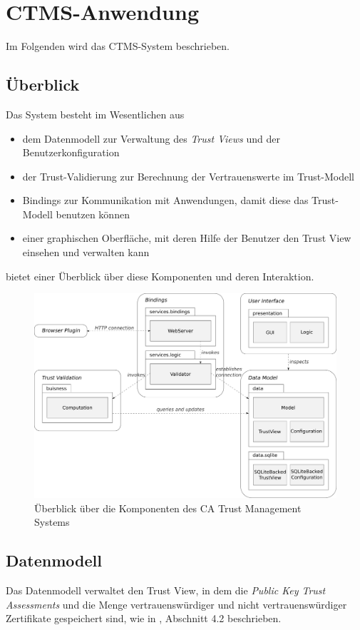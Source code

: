 \documentclass[accentcolor=tud1c,article,colorback,11pt]{tudreport}
\begin{document}
\section{CTMS-Anwendung}

Im Folgenden wird das CTMS-System beschrieben.

\subsection{Überblick}
Das System besteht im Wesentlichen aus
\begin{itemize}
\item dem Datenmodell zur Verwaltung des \textit{Trust Views} und der Benutzerkonfiguration
\item der Trust-Validierung zur Berechnung der Vertrauenswerte im Trust-Modell
\item Bindings zur Kommunikation mit Anwendungen, damit diese das Trust-Modell benutzen können
\item einer graphischen Oberfläche, mit deren Hilfe der Benutzer den Trust View  einsehen und verwalten kann
\end{itemize}
 bietet einer Überblick über diese Komponenten und deren Interaktion.

\begin{figure}[h]
  \centering
  \includegraphics[width=\textwidth]{overview}
  \caption{Überblick über die Komponenten des CA Trust Management Systems}
  \label{overview}
\end{figure}

\subsection{Datenmodell}
Das Datenmodell verwaltet den Trust View, in dem die \textit{Public Key Trust Assessments} und die Menge vertrauenswürdiger und nicht vertrauenswürdiger Zertifikate gespeichert sind, wie in \cite{braun2013trust}, Abschnitt 4.2 beschrieben.
\end{document}
